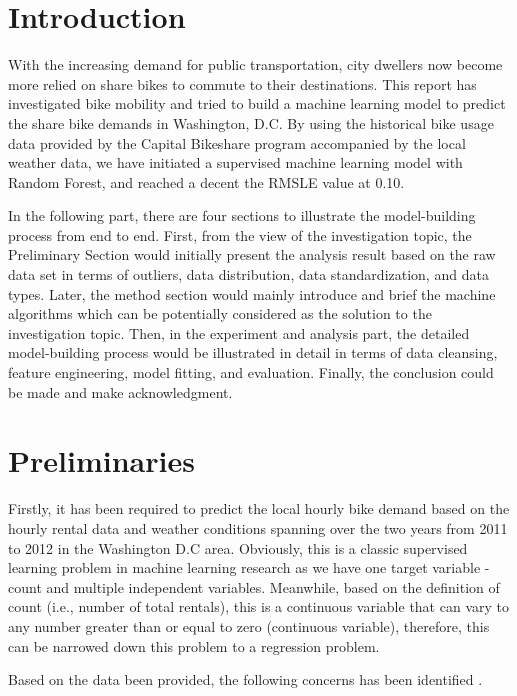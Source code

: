 \section{Introduction}\label{sec-intro}
With the increasing demand for public transportation, city dwellers now become more relied on share bikes to commute to their destinations. This report has investigated bike mobility and tried to build a machine learning model to predict the share bike demands in Washington, D.C. By using the historical bike usage data provided by the Capital Bikeshare program accompanied by the local weather data, we have initiated a supervised machine learning model with Random Forest, and reached a decent the RMSLE value at 0.10.

In the following part, there are four sections to illustrate the model-building process from end to end. First, from the view of the investigation topic, the Preliminary Section would initially present the analysis result based on the raw data set in terms of outliers, data distribution, data standardization, and data types. Later, the method section would mainly introduce and brief the machine algorithms which can be potentially considered as the solution to the investigation topic. Then, in the experiment and analysis part, the detailed model-building process would be illustrated in detail in terms of data cleansing, feature engineering, model fitting, and evaluation. Finally, the conclusion could be made and make acknowledgment.


\section{Preliminaries} \label{sec-preliminaries}

Firstly, it has been required to predict the local hourly bike demand based on the hourly rental data and weather conditions spanning over the two years from 2011 to 2012 in the Washington D.C area. Obviously, this is a classic supervised learning problem in machine learning research as we have one target variable - count and multiple independent variables. Meanwhile, based on the definition of count (i.e., number of total rentals), this is a continuous variable that can vary to any number greater than or equal to zero (continuous variable), therefore, this can be narrowed down this problem to a regression problem.

Based on the data been provided, the following concerns has been identified . 

